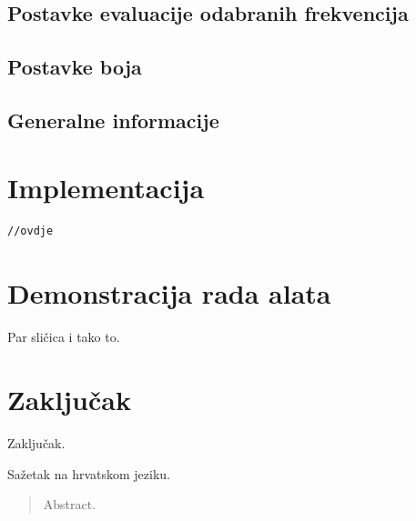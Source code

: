 \documentclass[times, utf8, diplomski]{fer}
\begin{document}
\section{Postavke evaluacije odabranih frekvencija}

\section{Postavke boja}

\section{Generalne informacije}


\chapter{Implementacija}

\begin{lstlisting}
//ovdje
\end{lstlisting}

\chapter{Demonstracija rada alata}
Par sličica i tako to.

\chapter{Zaključak}
Zaključak.




\begin{sazetak}
Sažetak na hrvatskom jeziku.

\end{sazetak}

\begin{abstract}
Abstract.

\end{abstract}
\end{document}

